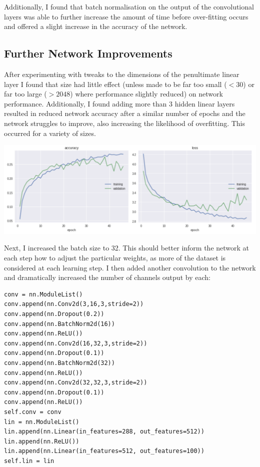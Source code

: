\documentclass[11pt]{article}
\begin{document}
Additionally, I found that batch normalisation on the output of the convolutional layers was able to further increase the amount of time before over-fitting occurs and offered a slight increase in the accuracy of the network.

\subsection{Further Network Improvements}


After experimenting with tweaks to the dimensions of the penultimate linear layer I found that size had little effect (unless made to be far too small ($<30$) or far too large ($>2048$) where performance slightly reduced) on network performance. Additionally, I found adding more than 3 hidden linear layers resulted in reduced network accuracy after a similar number of epochs and the network struggles to improve, also increasing the likelihood of overfitting. This occurred for a variety of sizes.

    \begin{center}
        \begin{minipage}{0.75\linewidth}
            \includegraphics[width=\linewidth]{accuracy6}
        \end{minipage}%
    \end{center}
    
Next, I increased the batch size to 32. This should better inform the network at each step how to adjust the particular weights, as more of the dataset is considered at each learning step. I then added another convolution to the network and dramatically increased the number of channels output by each:

\begin{small}
\begin{verbatim}
conv = nn.ModuleList()
conv.append(nn.Conv2d(3,16,3,stride=2))
conv.append(nn.Dropout(0.2))
conv.append(nn.BatchNorm2d(16))
conv.append(nn.ReLU())
conv.append(nn.Conv2d(16,32,3,stride=2))
conv.append(nn.Dropout(0.1))
conv.append(nn.BatchNorm2d(32))
conv.append(nn.ReLU())
conv.append(nn.Conv2d(32,32,3,stride=2))
conv.append(nn.Dropout(0.1))
conv.append(nn.ReLU())
self.conv = conv
lin = nn.ModuleList()
lin.append(nn.Linear(in_features=288, out_features=512))
lin.append(nn.ReLU())
lin.append(nn.Linear(in_features=512, out_features=100))
self.lin = lin
\end{verbatim}
\end{small}
\end{document}
